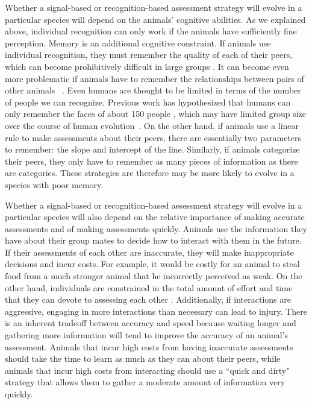 Whether a signal-based or recognition-based assessment strategy will evolve in a particular species will depend on the animals' cognitive abilities. As we explained above, individual recognition can only work if the animals have sufficiently fine perception. Memory is an additional cognitive constraint. If animals use individual recognition, they must remember the quality of each of their peers, which can become prohibitively difficult in large groups  \citep{Rohwer:1982fk,Solberg:1997uq}. It can become even more problematic if animals have to remember the relationships between pairs of other animals ~\citep{Seyfarth2015SocialCognition}. Even humans are thought to be limited in terms of the number of people we can recognize. Previous work has hypothesized that humans can only remember the faces of about 150 people \citep{Dunbar:1993zr,Hill:2003ly}, which may have limited group size over the course of human evolution~\citep{Dunbar:1992ys,Dunbar:1993zr}. On the other hand, if animals use a linear rule to make assessments about their peers, there are essentially two parameters to remember: the slope and intercept of the line. Similarly, if animals categorize their peers, they only have to remember as many pieces of information as there are categories. These strategies are therefore may be more likely to evolve in a species with poor memory.

Whether a signal-based or recognition-based assessment strategy will evolve in a particular species will also depend on the relative importance of making accurate assessments and of making assessments quickly. Animals use the information they have about their group mates to decide how to interact with them in the future. If their assessments of each other are inaccurate, they will make inappropriate decisions and incur costs. For example, it would be costly for an animal to steal food from a much stronger animal that he incorrectly perceived as weak. On the other hand, individuals are constrained in the total amount of effort and time that they can devote to assessing each other \citep{MacIver:2010ve}. Additionally, if interactions are aggressive, engaging in more interactions than necessary can lead to injury. There is an inherent tradeoff between accuracy and speed because waiting longer and gathering more information will tend to improve the accuracy of an animal's assessment. Animals that incur high costs from having inaccurate assessments should take the time to learn as much as they can about their peers, while animals that incur high costs from interacting should use a ``quick and dirty" strategy that allows them to gather a moderate amount of information very quickly. 

